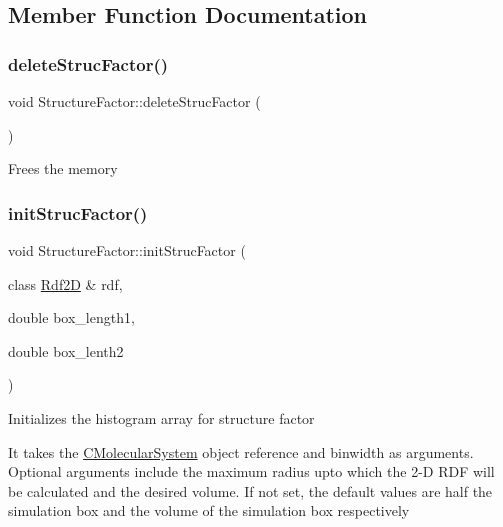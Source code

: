 \subsection{Member Function Documentation}
\mbox{\label{classStructureFactor_a0ac46fa427372d9b110f9f9657424803}} 
\subsubsection{\texorpdfstring{delete\+Struc\+Factor()}{deleteStrucFactor()}}
{\footnotesize\ttfamily void Structure\+Factor\+::delete\+Struc\+Factor (\begin{DoxyParamCaption}{ }\end{DoxyParamCaption})}

Frees the memory \mbox{\label{classStructureFactor_aa1afd82ced049c30b19ad13227301d25}} 
\subsubsection{\texorpdfstring{init\+Struc\+Factor()}{initStrucFactor()}}
{\footnotesize\ttfamily void Structure\+Factor\+::init\+Struc\+Factor (\begin{DoxyParamCaption}\item[{class \mbox{\hyperlink{classRdf2D}{Rdf2D}} \&}]{rdf,  }\item[{double}]{box\+\_\+length1,  }\item[{double}]{box\+\_\+lenth2 }\end{DoxyParamCaption})}

Initializes the histogram array for structure factor

It takes the \mbox{\hyperlink{classCMolecularSystem}{C\+Molecular\+System}} object reference and binwidth as arguments. Optional arguments include the maximum radius upto which the 2-\/D R\+DF will be calculated and the desired volume. If not set, the default values are half the simulation box and the volume of the simulation box respectively \mbox{\label{classStructureFactor_a5b3f1a43405ec79bc8de4075da1316fa}} 
